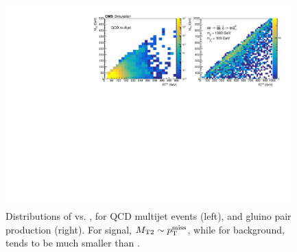 \begin{figure}[ht]
  \begin{center}
    \includegraphics[width=0.98\textwidth]{figs/overview_mt2/metmt2.pdf}
    \caption{Distributions of \mttwo vs. \ptmiss, for QCD multijet events (left), and gluino pair production (right).
      For signal, $M_{\mathrm{T2}}\sim p_{\mathrm{T}}^{\mathrm{miss}}$, while for background, \mttwo tends to be much smaller than \ptmiss.
            }
    \label{Fig:metmt2}
  \end{center}
\end{figure}
